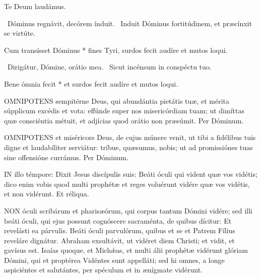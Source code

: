 Te Deum laudámus.


\V\ Dóminus regnávit, decórem índuit. \R\ Induit Dóminus fortitúdinem, et præcínxit se virtúte.

 Cum transísset Dóminus * fines Tyri, surdos fecit audíre et mutos loqui.


\V\ Dirigátur, Dómine, orátio mea. \R\ Sicut incénsum in conspéctu tuo.

 Bene ómnia fecit * et surdos fecit audíre et mutos loqui.


\lettrine[lines=2]{O}{MNIPOTENS} sempitérne Deus, qui abundántia pietátis tuæ, et mérita súpplicum excédis et vota: effúnde super nos misericórdiam tuam; ut dimíttas quæ consciéntia métuit, et adjícias quod orátio non præsúmit. Per Dóminum.




\lettrine[lines=2]{O}{MNIPOTENS} et miséricors Deus, de cujus múnere venit, ut tibi a fidélibus tuis digne et laudabíliter serviátur: tríbue, quæsumus, nobis; ut ad promissiónes tuas sine offensióne currámus. Per Dóminum.




\lettrine[lines=2]{I}{N} illo témpore: Dixit Jesus discípulis suis: Beáti óculi qui vident quæ vos vidétis; dico enim vobis quod multi prophétæ et reges voluérunt vidére quæ vos vidétis, et non vidérunt. Et réliqua.



\lettrine[lines=2]{N}{ON} óculi scribárum et pharisæórum, qui corpus tantum Dómini vidére; sed illi beáti óculi, qui ejus possunt cognóscere sacraménta, de quibus dícitur: Et revelásti ea párvulis. Beáti óculi parvulórum, quibus et se et Patrem Fílius reveláre dignátur. Abraham exsultávit, ut vidéret diem Christi; et vidit, et gavísus est. Isaías quoque, et Michǽas, et multi álii prophétæ vidérunt glóriam Dómini, qui et proptérea Vidéntes sunt appelláti; sed hi omnes, a longe aspiciéntes et salutántes, per spéculum et in ænígmate vidérunt.

